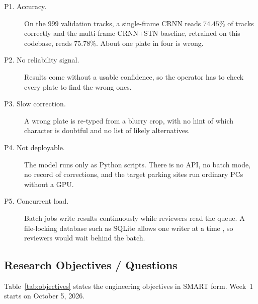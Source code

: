 \begin{description}
  \item[P1. Accuracy.] On the 999 validation tracks, a single-frame CRNN reads $74.45\%$ of tracks
        correctly and the multi-frame CRNN+STN baseline, retrained on this codebase, reads
        $75.78\%$. About one plate in four is wrong.
  \item[P2. No reliability signal.] Results come without a usable confidence, so the operator has
        to check every plate to find the wrong ones.
  \item[P3. Slow correction.] A wrong plate is re-typed from a blurry crop, with no hint of which
        character is doubtful and no list of likely alternatives.
  \item[P4. Not deployable.] The model runs only as Python scripts. There is no API, no batch mode,
        no record of corrections, and the target parking sites run ordinary PCs without a GPU.
  \item[P5. Concurrent load.] Batch jobs write results continuously while reviewers read the queue.
        A file-locking database such as SQLite allows one writer at a time \cite{sqlite_lock}, so
        reviewers would wait behind the batch.
\end{description}


\subsection{Research Objectives / Questions}

Table~\ref{tab:objectives} states the engineering objectives in SMART form. Week~1 starts on
October 5, 2026.


